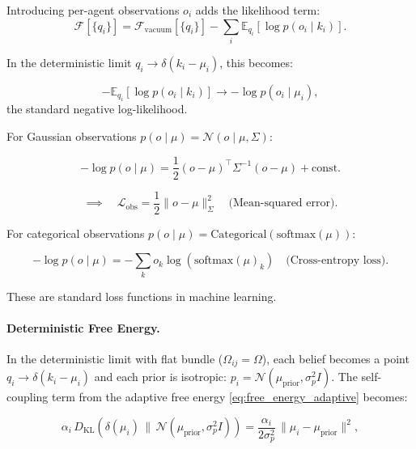 \documentclass[twoside,11pt]{article}
\begin{document}
Introducing per-agent observations $o_i$ adds the likelihood term:
\begin{equation}
\mathcal{F}[\{q_i\}] = \mathcal{F}_{\text{vacuum}}[\{q_i\}] - \sum_i \mathbb{E}_{q_i}[\log p(o_i \mid k_i)].
\end{equation}

In the deterministic limit $q_i \to \delta(k_i - \mu_i)$, this becomes:

\begin{equation}
-\mathbb{E}_{q_i}[\log p(o_i \mid k_i)] \to -\log p(o_i \mid \mu_i),
\end{equation}
the standard negative log-likelihood.

For Gaussian observations $p(o \mid \mu) = \mathcal{N}(o \mid \mu, \Sigma)$:

\begin{equation}
-\log p(o \mid \mu) = \frac{1}{2}(o - \mu)^\top \Sigma^{-1} (o - \mu) + \text{const.}
\end{equation}

\begin{equation}
\implies \quad \mathcal{L}_{\text{obs}} = \frac{1}{2}\|o - \mu\|^2_{\Sigma} \quad \text{(Mean-squared error)}.
\end{equation}

For categorical observations $p(o \mid \mu) = \mathrm{Categorical}(\mathrm{softmax}(\mu))$:

\begin{equation}
-\log p(o \mid \mu) = -\sum_k o_k \log(\mathrm{softmax}(\mu)_k) \quad \text{(Cross-entropy loss)}.
\end{equation}

These are standard loss functions in machine learning. 


\paragraph{Deterministic Free Energy.}

In the deterministic limit with flat bundle ($\Omega_{ij} = \Omega$), each belief becomes a point $q_i \to \delta(k_i - \mu_i)$ and each prior is isotropic: $p_i = \mathcal{N}(\mu_{\text{prior}}, \sigma_p^2 I)$. The self-coupling term from the adaptive free energy \eqref{eq:free_energy_adaptive} becomes:

\begin{equation}
\alpha_i \,D_{\mathrm{KL}}(\delta(\mu_i) \,\|\, \mathcal{N}(\mu_{\text{prior}}, \sigma_p^2 I))
= \frac{\alpha_i}{2\sigma_p^2}\,\|\mu_i - \mu_{\text{prior}}\|^2,
\end{equation}
\end{document}
